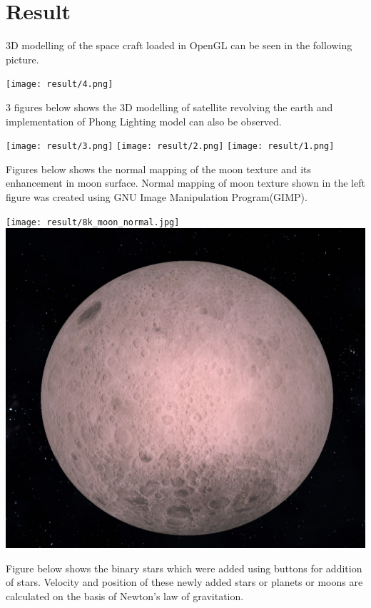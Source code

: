 \documentclass[12pt]{article}
\begin{document}
\clearpage

\section{Result}

3D modelling of the space craft loaded in OpenGL can be seen in the following picture. 

\begin{center}
	\texttt{[image: result/4.png]}
\end{center}

3 figures below shows the 3D modelling of satellite revolving the earth and implementation of Phong Lighting model can also be observed.
\begin{center}
	\texttt{[image: result/3.png]}
	\texttt{[image: result/2.png]}
	\texttt{[image: result/1.png]}
\end{center}

Figures below shows the normal mapping of the moon texture and its enhancement in moon surface. Normal mapping of moon texture shown in the left figure was created using GNU Image Manipulation Program(GIMP).

\begin{center}
	\texttt{[image: result/8k\_moon\_normal.jpg]}	
	\includegraphics[scale=0.2]{result/moon.png}
\end{center}

\clearpage

Figure below shows the binary stars which were added using buttons for addition of stars. Velocity and position of these newly added stars or planets or moons are calculated on the basis of Newton's law of gravitation.
\end{document}
